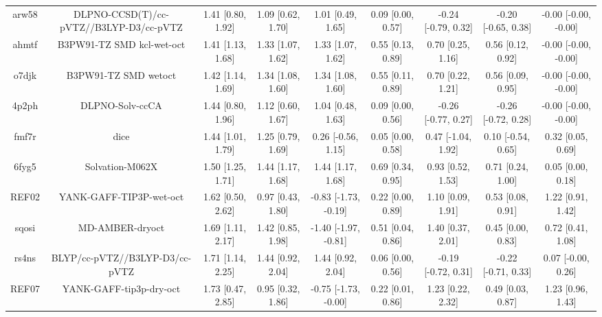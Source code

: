 \documentclass{article}
\begin{document}
\begin{center}
\begin{longtable}{|ccccccccc|}
 arw58 &            DLPNO-CCSD(T)/cc-pVTZ//B3LYP-D3/cc-pVTZ &  1.41 [0.80, 1.92] &  1.09 [0.62, 1.70] &     1.01 [0.49, 1.65] &  0.09 [0.00, 0.57] &  -0.24 [-0.79, 0.32] &  -0.20 [-0.65, 0.38] &  -0.00 [-0.00, -0.00] \\
 ahmtf &                          B3PW91-TZ SMD kcl-wet-oct &  1.41 [1.13, 1.68] &  1.33 [1.07, 1.62] &     1.33 [1.07, 1.62] &  0.55 [0.13, 0.89] &    0.70 [0.25, 1.16] &    0.56 [0.12, 0.92] &  -0.00 [-0.00, -0.00] \\
 o7djk &                               B3PW91-TZ SMD wetoct &  1.42 [1.14, 1.69] &  1.34 [1.08, 1.60] &     1.34 [1.08, 1.60] &  0.55 [0.11, 0.89] &    0.70 [0.22, 1.21] &    0.56 [0.09, 0.95] &  -0.00 [-0.00, -0.00] \\
 4p2ph &                                    DLPNO-Solv-ccCA &  1.44 [0.80, 1.96] &  1.12 [0.60, 1.67] &     1.04 [0.48, 1.63] &  0.09 [0.00, 0.56] &  -0.26 [-0.77, 0.27] &  -0.26 [-0.72, 0.28] &  -0.00 [-0.00, -0.00] \\
 fmf7r &                                               dice &  1.44 [1.01, 1.79] &  1.25 [0.79, 1.69] &    0.26 [-0.56, 1.15] &  0.05 [0.00, 0.58] &   0.47 [-1.04, 1.92] &   0.10 [-0.54, 0.65] &     0.32 [0.05, 0.69] \\
 6fyg5 &                                    Solvation-M062X &  1.50 [1.25, 1.71] &  1.44 [1.17, 1.68] &     1.44 [1.17, 1.68] &  0.69 [0.34, 0.95] &    0.93 [0.52, 1.53] &    0.71 [0.24, 1.00] &     0.05 [0.00, 0.18] \\
 REF02 &                            YANK-GAFF-TIP3P-wet-oct &  1.62 [0.50, 2.62] &  0.97 [0.43, 1.80] &  -0.83 [-1.73, -0.19] &  0.22 [0.00, 0.89] &    1.10 [0.09, 1.91] &    0.53 [0.08, 0.91] &     1.22 [0.91, 1.42] \\
 sqosi &                                    MD-AMBER-dryoct &  1.69 [1.11, 2.17] &  1.42 [0.85, 1.98] &  -1.40 [-1.97, -0.81] &  0.51 [0.04, 0.86] &    1.40 [0.37, 2.01] &    0.45 [0.00, 0.83] &     0.72 [0.41, 1.08] \\
 rs4ns &                     BLYP/cc-pVTZ//B3LYP-D3/cc-pVTZ &  1.71 [1.14, 2.25] &  1.44 [0.92, 2.04] &     1.44 [0.92, 2.04] &  0.06 [0.00, 0.56] &  -0.19 [-0.72, 0.31] &  -0.22 [-0.71, 0.33] &    0.07 [-0.00, 0.26] \\
 REF07 &                            YANK-GAFF-tip3p-dry-oct &  1.73 [0.47, 2.85] &  0.95 [0.32, 1.86] &  -0.75 [-1.73, -0.00] &  0.22 [0.01, 0.86] &    1.23 [0.22, 2.32] &    0.49 [0.03, 0.87] &     1.23 [0.96, 1.43] \\

\end{longtable}
\end{center}
\end{document}
